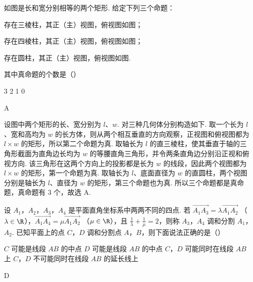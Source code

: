 \begin{problem}
如图是长和宽分别相等的两个矩形. 给定下列三个命题：

\begin{circlelist}
\item 存在三棱柱，其正（主）视图，俯视图如图；
\item 存在四棱柱，其正（主）视图，俯视图如图；
\item 存在圆柱，其正（主）视图，俯视图如图.
\end{circlelist}

其中真命题的个数是（\quad）

\choices
    {3}
    {2}
    {1}
    {0}
\end{problem}

\begin{answer}
A
\end{answer}

\begin{solution}
设图中两个矩形的长、宽分别为 \(l\)、\(w\). 对三种几何体分别构造如下.
取一个长为 \(l\)、宽和高均为 \(w\) 的长方体，则从两个相互垂直的方向观察，正视图和俯视图都为 \(l\times w\) 的矩形，所以第二个命题为真.
取轴长为 \(l\) 的直三棱柱，使其垂直于轴的三角形截面为直角边长均为 \(w\) 的等腰直角三角形，并令两条直角边分别沿正视和俯视方向. 该三角形在这两个方向上的投影都是长为 \(w\) 的线段，因此两个视图都为 \(l\times w\) 的矩形，第一个命题为真.
取轴长为 \(l\)、底面直径为 \(w\) 的直圆柱，两个视图分别是轴长为 \(l\)、直径为 \(w\) 的矩形，第三个命题也为真.
所以三个命题都是真命题，真命题有 \(3\) 个，故选 A.
\end{solution}

\begin{problem}
设 \(A_{1}\)，\(A_{2}\)，\(A_{3}\)，\(A_{4}\) 是平面直角坐标系中两两不同的四点. 若 \(\overrightarrow{A_{1}A_{3}} = \lambda \overrightarrow{A_{1}A_{2}}\) （\(\lambda \in \R\)），\(\overrightarrow{A_{1}A_{4}} = \mu \overrightarrow{A_{1}A_{2}}\) （\(\mu \in \R\)），且 \(\frac{1}{\lambda} + \frac{1}{\mu} = 2\)，则称 \(A_{3}\)，\(A_{4}\) 调和分割 \(A_{1}\)，\(A_{2}\). 已知平面上的点 \(C\)，\(D\) 调和分割点 \(A\)，\(B\)，则下面说法正确的是（\quad）

\choices
    {\(C\) 可能是线段 \(AB\) 的中点}
    {\(D\) 可能是线段 \(AB\) 的中点}
    {\(C\)，\(D\) 可能同时在线段 \(AB\) 上}
    {\(C\)，\(D\) 不可能同时在线段 \(AB\) 的延长线上}
\end{problem}

\begin{answer}
D
\end{answer}

